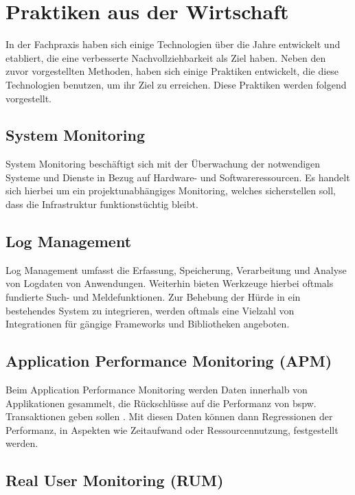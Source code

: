 \section{Praktiken aus der Wirtschaft}

In der Fachpraxis haben sich einige Technologien über die Jahre entwickelt und etabliert, die eine verbesserte Nachvollziehbarkeit als Ziel haben. Neben den zuvor vorgestellten Methoden, haben sich einige Praktiken entwickelt, die diese Technologien benutzen, um ihr Ziel zu erreichen. Diese Praktiken werden folgend vorgestellt.

\subsection{System Monitoring}

System Monitoring beschäftigt sich mit der Überwachung der notwendigen Systeme und Dienste in Bezug auf Hardware- und Softwareressourcen. Es handelt sich hierbei um ein projektunabhängiges Monitoring, welches sicherstellen soll, dass die Infrastruktur funktionstüchtig bleibt.

\subsection{Log Management}

Log Management umfasst die Erfassung, Speicherung, Verarbeitung und Analyse von Logdaten von Anwendungen. Weiterhin bieten Werkzeuge hierbei oftmals fundierte Such- und Meldefunktionen. Zur Behebung der Hürde in ein bestehendes System zu integrieren, werden oftmals eine Vielzahl von Integrationen für gängige Frameworks und Bibliotheken angeboten.

\subsection{Application Performance Monitoring (APM)}

Beim Application Performance Monitoring werden Daten innerhalb von Applikationen gesammelt, die Rückschlüsse auf die Performanz von bspw. Transaktionen geben sollen \cite{StudyingTheEffectivenessOfAPMTools}. Mit diesen Daten können dann Regressionen der Performanz, in Aspekten wie Zeitaufwand oder Ressourcennutzung, festgestellt werden.

\subsection{Real User Monitoring (RUM)}

